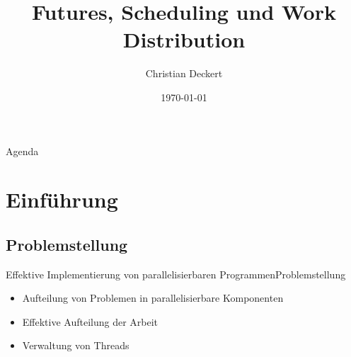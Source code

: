 \documentclass{beamer}
\title{Futures, Scheduling und Work Distribution}
\author{Christian Deckert}
\date{\today}
\institute{Universit\"at Mannheim}
\begin{document}
%
%
\maketitle

%
%
\begin{frame}{Agenda}
\tableofcontents[currentsection]
\end{frame}


%
%
%
\section{Einf\"uhrung}

\subsection{Problemstellung}
%
%
\begin{frame}{Effektive Implementierung von parallelisierbaren Programmen}{Problemstellung}

\begin{itemize}
\item Aufteilung von Problemen in parallelisierbare Komponenten
\item Effektive Aufteilung der Arbeit
\item Verwaltung von Threads
\end{itemize}
\end{frame}
\end{document}
